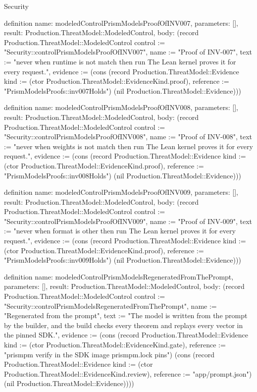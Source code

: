 \begin{lexlean}{Security}
\begin{semanticmodule}
definition{
  name: modeledControlPrismModelsProofOfINV007,
  parameters: [],
  result: Production.ThreatModel::ModeledControl,
  body: (record Production.ThreatModel::ModeledControl {control := "Security::controlPrismModelsProofOfINV007", name := "Proof of INV-007", text := "never when runtime is not match then run The Lean kernel proves it for every request.", evidence := (cons (record Production.ThreatModel::Evidence {kind := (ctor Production.ThreatModel::EvidenceKind.proof), reference := "PrismModelsProofs::inv007Holds"}) (nil Production.ThreatModel::Evidence))})
}

definition{
  name: modeledControlPrismModelsProofOfINV008,
  parameters: [],
  result: Production.ThreatModel::ModeledControl,
  body: (record Production.ThreatModel::ModeledControl {control := "Security::controlPrismModelsProofOfINV008", name := "Proof of INV-008", text := "never when weights is not match then run The Lean kernel proves it for every request.", evidence := (cons (record Production.ThreatModel::Evidence {kind := (ctor Production.ThreatModel::EvidenceKind.proof), reference := "PrismModelsProofs::inv008Holds"}) (nil Production.ThreatModel::Evidence))})
}

definition{
  name: modeledControlPrismModelsProofOfINV009,
  parameters: [],
  result: Production.ThreatModel::ModeledControl,
  body: (record Production.ThreatModel::ModeledControl {control := "Security::controlPrismModelsProofOfINV009", name := "Proof of INV-009", text := "never when format is other then run The Lean kernel proves it for every request.", evidence := (cons (record Production.ThreatModel::Evidence {kind := (ctor Production.ThreatModel::EvidenceKind.proof), reference := "PrismModelsProofs::inv009Holds"}) (nil Production.ThreatModel::Evidence))})
}

definition{
  name: modeledControlPrismModelsRegeneratedFromThePrompt,
  parameters: [],
  result: Production.ThreatModel::ModeledControl,
  body: (record Production.ThreatModel::ModeledControl {control := "Security::controlPrismModelsRegeneratedFromThePrompt", name := "Regenerated from the prompt", text := "The model is written from the prompt by the builder, and the build checks every theorem and replays every vector in the pinned SDK.", evidence := (cons (record Production.ThreatModel::Evidence {kind := (ctor Production.ThreatModel::EvidenceKind.gate), reference := "prismpm verify in the SDK image prismpm.lock pins"}) (cons (record Production.ThreatModel::Evidence {kind := (ctor Production.ThreatModel::EvidenceKind.review), reference := "app/prompt.json"}) (nil Production.ThreatModel::Evidence)))})
}


\end{semanticmodule}
\end{lexlean}
